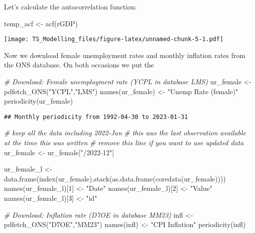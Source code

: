 \documentclass[
]{article}
\newenvironment{Shaded}{\begin{snugshade}}{\end{snugshade}}
\newcommand{\CommentTok}[1]{\textcolor[rgb]{0.56,0.35,0.01}{\textit{#1}}}
\newcommand{\DecValTok}[1]{\textcolor[rgb]{0.00,0.00,0.81}{#1}}
\newcommand{\FunctionTok}[1]{\textcolor[rgb]{0.00,0.00,0.00}{#1}}
\newcommand{\NormalTok}[1]{#1}
\newcommand{\OtherTok}[1]{\textcolor[rgb]{0.56,0.35,0.01}{#1}}
\newcommand{\StringTok}[1]{\textcolor[rgb]{0.31,0.60,0.02}{#1}}
\begin{document}
Let's calculate the autocorrelation function:

\begin{Shaded}
\begin{Highlighting}[]
\NormalTok{temp\_acf }\OtherTok{\textless{}{-}} \FunctionTok{acf}\NormalTok{(rGDP)}
\end{Highlighting}
\end{Shaded}

\texttt{[image: TS\_Modelling\_files/figure-latex/unnamed-chunk-5-1.pdf]}

Now we download female unemployment rates and monthly inflation rates
from the ONS database. On both occasions we put the

\begin{Shaded}
\begin{Highlighting}[]
\CommentTok{\# Download: Female unemployment rate (YCPL in database LMS)}
\NormalTok{ur\_female }\OtherTok{\textless{}{-}} \FunctionTok{pdfetch\_ONS}\NormalTok{(}\StringTok{"YCPL"}\NormalTok{,}\StringTok{"LMS"}\NormalTok{)}
\FunctionTok{names}\NormalTok{(ur\_female) }\OtherTok{\textless{}{-}} \StringTok{"Unemp Rate (female)"}
\FunctionTok{periodicity}\NormalTok{(ur\_female)}
\end{Highlighting}
\end{Shaded}

\begin{verbatim}
## Monthly periodicity from 1992-04-30 to 2023-01-31
\end{verbatim}

\begin{Shaded}
\begin{Highlighting}[]
\CommentTok{\# keep all the data including 2022{-}Jan}
\CommentTok{\# this was the last observation available at the time this was written}
\CommentTok{\# remove this line if you want to use updated data}
\NormalTok{ur\_female }\OtherTok{\textless{}{-}}\NormalTok{ ur\_female[}\StringTok{"/2022{-}12"}\NormalTok{]  }

\NormalTok{ur\_female\_l }\OtherTok{\textless{}{-}} \FunctionTok{data.frame}\NormalTok{(}\FunctionTok{index}\NormalTok{(ur\_female),}\FunctionTok{stack}\NormalTok{(}\FunctionTok{as.data.frame}\NormalTok{(}\FunctionTok{coredata}\NormalTok{(ur\_female))))}
\FunctionTok{names}\NormalTok{(ur\_female\_l)[}\DecValTok{1}\NormalTok{] }\OtherTok{\textless{}{-}} \StringTok{"Date"}
\FunctionTok{names}\NormalTok{(ur\_female\_l)[}\DecValTok{2}\NormalTok{] }\OtherTok{\textless{}{-}} \StringTok{"Value"}
\FunctionTok{names}\NormalTok{(ur\_female\_l)[}\DecValTok{3}\NormalTok{] }\OtherTok{\textless{}{-}} \StringTok{"id"}

\CommentTok{\# Download: Inflation rate (D7OE in database MM23)}
\NormalTok{infl }\OtherTok{\textless{}{-}} \FunctionTok{pdfetch\_ONS}\NormalTok{(}\StringTok{"D7OE"}\NormalTok{,}\StringTok{"MM23"}\NormalTok{)}
\FunctionTok{names}\NormalTok{(infl) }\OtherTok{\textless{}{-}} \StringTok{"CPI Inflation"}
\FunctionTok{periodicity}\NormalTok{(infl)}
\end{Highlighting}
\end{Shaded}
\end{document}

